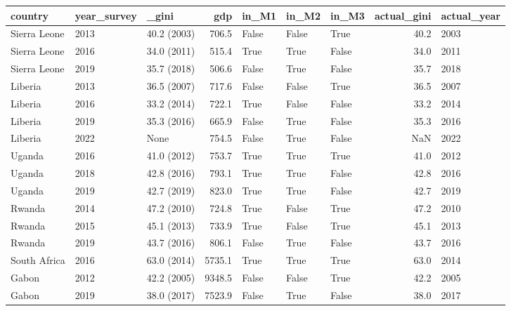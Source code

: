 \begin{tabular}{lllrlllrl}
\toprule
     country & year\_survey &       \_gini &    gdp & in\_M1 & in\_M2 & in\_M3 &  actual\_gini & actual\_year \\
\midrule
Sierra Leone &        2013 & 40.2 (2003) &  706.5 & False & False &  True &         40.2 &        2003 \\
Sierra Leone &        2016 & 34.0 (2011) &  515.4 &  True &  True & False &         34.0 &        2011 \\
Sierra Leone &        2019 & 35.7 (2018) &  506.6 & False &  True & False &         35.7 &        2018 \\
     Liberia &        2013 & 36.5 (2007) &  717.6 & False & False &  True &         36.5 &        2007 \\
     Liberia &        2016 & 33.2 (2014) &  722.1 &  True & False & False &         33.2 &        2014 \\
     Liberia &        2019 & 35.3 (2016) &  665.9 & False &  True & False &         35.3 &        2016 \\
     Liberia &        2022 &        None &  754.5 & False &  True & False &          NaN &        2022 \\
      Uganda &        2016 & 41.0 (2012) &  753.7 &  True &  True &  True &         41.0 &        2012 \\
      Uganda &        2018 & 42.8 (2016) &  793.1 &  True &  True & False &         42.8 &        2016 \\
      Uganda &        2019 & 42.7 (2019) &  823.0 &  True &  True & False &         42.7 &        2019 \\
      Rwanda &        2014 & 47.2 (2010) &  724.8 &  True & False &  True &         47.2 &        2010 \\
      Rwanda &        2015 & 45.1 (2013) &  733.9 &  True & False &  True &         45.1 &        2013 \\
      Rwanda &        2019 & 43.7 (2016) &  806.1 & False &  True & False &         43.7 &        2016 \\
South Africa &        2016 & 63.0 (2014) & 5735.1 &  True &  True &  True &         63.0 &        2014 \\
       Gabon &        2012 & 42.2 (2005) & 9348.5 & False & False &  True &         42.2 &        2005 \\
       Gabon &        2019 & 38.0 (2017) & 7523.9 & False &  True & False &         38.0 &        2017 \\
\bottomrule
\end{tabular}
